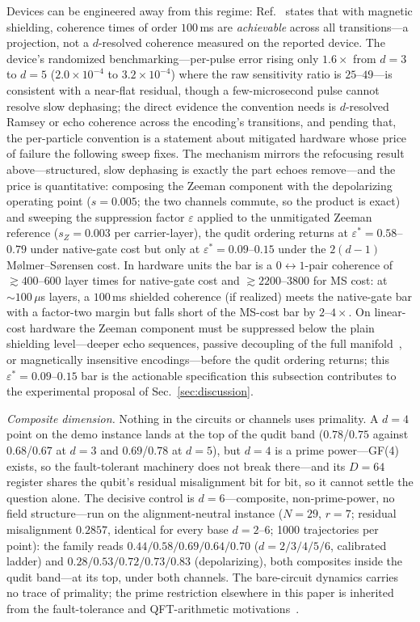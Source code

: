 \documentclass[aps,pra,reprint,superscriptaddress,nofootinbib,floatfix]{revtex4-2}
\begin{document}
Devices can be engineered away from this regime:
Ref.~\cite{ringbauer2022} states that with magnetic shielding,
coherence times of order $100$\,ms are \emph{achievable} across all
transitions---a projection, not a $d$-resolved coherence measured on
the reported device. The device's randomized
benchmarking---per-pulse error rising only $1.6\times$ from $d=3$ to
$d=5$ ($2.0\times10^{-4}$ to $3.2\times10^{-4}$) where the raw
sensitivity ratio is $25$--$49$---is consistent with a near-flat
residual, though a few-microsecond pulse cannot resolve slow
dephasing; the direct evidence the convention needs is $d$-resolved
Ramsey or echo coherence across the encoding's transitions, and
pending that, the per-particle convention is a statement about
mitigated hardware whose price of failure the following sweep
fixes. The mechanism mirrors the refocusing result
above---structured, slow
dephasing is exactly the part echoes remove---and the price is
quantitative: composing the Zeeman component with the depolarizing
operating point ($s=0.005$; the two channels commute, so the product
is exact) and sweeping the suppression factor $\varepsilon$ applied
to the unmitigated Zeeman reference ($s_Z=0.003$ per carrier-layer),
the qudit ordering returns at $\varepsilon^\ast=0.58$--$0.79$ under
native-gate cost but only at $\varepsilon^\ast=0.09$--$0.15$ under
the $2(d{-}1)$ M{\o}lmer--S{\o}rensen cost. In hardware units the bar
is a $0{\leftrightarrow}1$-pair coherence of ${\gtrsim}400$--$600$
layer times for native-gate cost and ${\gtrsim}2200$--$3800$ for MS
cost: at ${\sim}100\,\mu$s layers, a $100$\,ms shielded coherence
(if realized) meets the native-gate bar with a factor-two margin but
falls short of the MS-cost bar by $2$--$4\times$. On linear-cost hardware the
Zeeman component must be suppressed below the plain shielding
level---deeper echo sequences, passive decoupling of the full
manifold~\cite{sutherland2023}, or magnetically insensitive
encodings---before the qudit ordering returns; this
$\varepsilon^\ast=0.09$--$0.15$ bar is the actionable specification
this subsection contributes to the experimental proposal of
Sec.~\ref{sec:discussion}.

\emph{Composite dimension.} Nothing in the circuits or channels uses
primality. A $d=4$ point on the demo instance lands at the top of
the qudit band
($0.78$/$0.75$ against $0.68$/$0.67$ at $d=3$ and $0.69$/$0.78$ at
$d=5$), but $d=4$ is a prime power---GF(4) exists, so the
fault-tolerant machinery does not break there---and its $D=64$
register shares the qubit's residual misalignment bit for bit, so it
cannot settle the question alone. The decisive control is
$d=6$---composite, non-prime-power, no field structure---run on the
alignment-neutral instance ($N=29$, $r=7$; residual misalignment
$0.2857$, identical for every base $d=2$--$6$; 1000 trajectories per
point): the family reads $0.44/0.58/0.69/0.64/0.70$
($d=2/3/4/5/6$, calibrated ladder) and $0.28/0.53/0.72/0.73/0.83$
(depolarizing), both composites inside the qudit band---at its top,
under both channels. The bare-circuit dynamics carries no
trace of primality; the prime restriction elsewhere in this paper is
inherited from the fault-tolerance and QFT-arithmetic
motivations~\cite{gottesman1999,campbell2012,floratos2024}.
\end{document}

